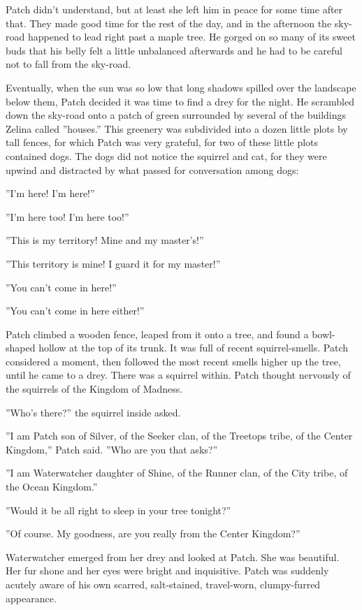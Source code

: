 \documentclass[12pt]{book}
\begin{document}
 Patch didn't understand, but at least she left him in peace for some time after that. They made good time for the rest of the day, and in the afternoon the sky-road happened to lead right past a maple tree. He gorged on so many of its sweet buds that his belly felt a little unbalanced afterwards and he had to be careful not to fall from the sky-road.\par
 Eventually, when the sun was so low that long shadows spilled over the landscape below them, Patch decided it was time to find a drey for the night. He scrambled down the sky-road onto a patch of green surrounded by several of the buildings Zelina called ''houses.'' This greenery was subdivided into a dozen little plots by tall fences, for which Patch was very grateful, for two of these little plots contained dogs. The dogs did not notice the squirrel and cat, for they were upwind and distracted by what passed for conversation among dogs:\par
 ''I'm here! I'm here!''\par
 ''I'm here too! I'm here too!''\par
 ''This is my territory! Mine and my master's!''\par
 ''This territory is mine! I guard it for my master!''\par
 ''You can't come in here!''\par
 ''You can't come in here either!''\par
 Patch climbed a wooden fence, leaped from it onto a tree, and found a bowl-shaped hollow at the top of its trunk. It was full of recent squirrel-smells. Patch considered a moment, then followed the most recent smells higher up the tree, until he came to a drey. There was a squirrel within. Patch thought nervously of the squirrels of the Kingdom of Madness.\par
 ''Who's there?'' the squirrel inside asked.\par
 ''I am Patch son of Silver, of the Seeker clan, of the Treetops tribe, of the Center Kingdom,'' Patch said. ''Who are you that asks?''\par
 ''I am Waterwatcher daughter of Shine, of the Runner clan, of the City tribe, of the Ocean Kingdom.''\par
 ''Would it be all right to sleep in your tree tonight?''\par
 ''Of course. My goodness, are you really from the Center Kingdom?''\par
Waterwatcher emerged from her drey and looked at Patch. She was beautiful. Her fur shone and her eyes were bright and inquisitive. Patch was suddenly acutely aware of his own scarred, salt-stained, travel-worn, clumpy-furred appearance.\par
\end{document}

